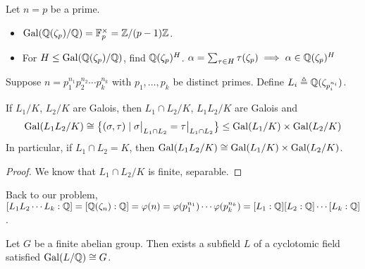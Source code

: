 \begin{example}
  Let $n = p$ be a prime.
  \begin{itemize}
    \item $\operatorname{Gal}(\mathbb{Q}(\zeta_p) / \mathbb{Q}) = \mathbb{F}_p^\times = \mathbb{Z} / (p-1)\mathbb{Z}$.
    \item For $H \leq \operatorname{Gal}(\mathbb{Q}(\zeta_p) / \mathbb{Q})$, find $\mathbb{Q}(\zeta_p)^H$. 
      $\alpha = \sum_{\tau \in H} \tau(\zeta_p) \implies \alpha \in \mathbb{Q}(\zeta_p)^H$

  \end{itemize}
\end{example}
\begin{example}
  Suppose $n = p_1^{n_1} p_2^{n_2} \cdots p_k^{n_k}$ with $p_1, \dots, p_k$ be distinct primes.
  Define $L_i \triangleq \mathbb{Q}(\zeta_{p_i^{n_i}})$.
\end{example}

\begin{lemma}
  If $L_1 / K$, $L_2 / K$ are Galois, then $L_1 \cap L_2 / K$, $L_1 L_2 / K$ are Galois and
  \[ \operatorname{Gal}( L_1 L_2 / K) \cong \big\{ (\sigma, \tau) \mid \sigma\big|_{L_1 \cap L_2} = \tau\big|_{L_1 \cap L_2} \big\}
    \leq \operatorname{Gal}(L_1 / K) \times \operatorname{Gal}(L_2 / K) \]
  In particular, if $L_1 \cap L_2 = K$, then $\operatorname{Gal}(L_1 L_2 / K) \cong \operatorname{Gal}(L_1 / K) \times \operatorname{Gal}(L_2 / K)$.

  \begin{proof}
    We know that $L_1 \cap L_2 / K$ is finite, separable.
  \end{proof}
\end{lemma}

Back to our problem, $[L_1 L_2 \cdots L_k: \mathbb{Q}] = [\mathbb{Q}(\zeta_n): \mathbb{Q}] = \varphi(n) = \varphi(p_1^{n_1})
\cdots \varphi(p_k^{n_k}) = [L_1 : \mathbb{Q}] [L_2 : \mathbb{Q}] \cdots [L_k : \mathbb{Q}]$.

\begin{theorem}
  Let $G$ be a finite abelian group. Then exists a subfield $L$ of a cyclotomic field satisfied $\operatorname{Gal}(L / \mathbb{Q}) \cong G$.
\end{theorem}
